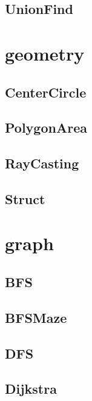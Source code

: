 \subsection{ UnionFind}
\raggedbottom
\hrulefill

\section{geometry}
\subsection{ CenterCircle}
\raggedbottom
\hrulefill
\subsection{ PolygonArea}
\raggedbottom
\hrulefill
\subsection{ RayCasting}
\raggedbottom
\hrulefill
\subsection{ Struct}
\raggedbottom
\hrulefill

\section{graph}
\subsection{ BFS}
\raggedbottom
\hrulefill
\subsection{ BFSMaze}
\raggedbottom
\hrulefill
\subsection{ DFS}
\raggedbottom
\hrulefill
\subsection{ Dijkstra}
\raggedbottom
\hrulefill
